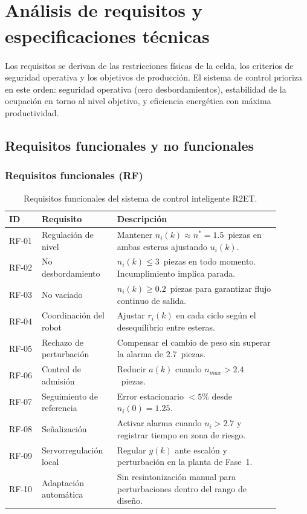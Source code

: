 \chapter[Requisitos y especificaciones]{Análisis de requisitos y especificaciones técnicas\textsuperscript{\normalfont *}}
\label{ch:requisitos}
\begingroup\renewcommand\thefootnote{*}\renewcommand{}\endgroup

Los requisitos se derivan de las restricciones físicas de la celda, los criterios de seguridad operativa y los objetivos de producción. El sistema de control prioriza en este orden: seguridad operativa (cero desbordamientos), estabilidad de la ocupación en torno al nivel objetivo, y eficiencia energética con máxima productividad.

\section{Requisitos funcionales y no funcionales}

\subsection*{Requisitos funcionales (RF)}

\begin{table}[H]
\centering
\small
\caption{Requisitos funcionales del sistema de control inteligente R2ET.}
\label{tab:req_func}
\begin{tabular}{@{}P{0.11\linewidth}P{0.23\linewidth}P{0.55\linewidth}@{}}
\toprule
ID & Requisito & Descripción \\ \midrule
RF-01 & Regulación de nivel & Mantener $n_i(k) \approx n^* = 1.5$~piezas en ambas esteras ajustando $u_i(k)$.\\
RF-02 & No desbordamiento & $n_i(k) \leq 3$~piezas en todo momento. Incumplimiento implica parada.\\
RF-03 & No vaciado & $n_i(k) \geq 0.2$~piezas para garantizar flujo continuo de salida.\\
RF-04 & Coordinación del robot & Ajustar $r_i(k)$ en cada ciclo según el desequilibrio entre esteras.\\
RF-05 & Rechazo de perturbación & Compensar el cambio de peso sin superar la alarma de 2.7~piezas.\\
RF-06 & Control de admisión & Reducir $a(k)$ cuando $n_{max} > 2.4$~piezas.\\
RF-07 & Seguimiento de referencia & Error estacionario $<5\%$ desde $n_i(0)=1.25$.\\
RF-08 & Señalización & Activar alarma cuando $n_i > 2.7$ y registrar tiempo en zona de riesgo.\\
RF-09 & Servorregulación local & Regular $y(k)$ ante escalón y perturbación en la planta de Fase~1.\\
RF-10 & Adaptación automática & Sin resintonización manual para perturbaciones dentro del rango de diseño.\\
\bottomrule
\end{tabular}
\end{table}

